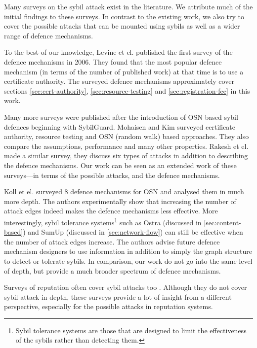 Many surveys on the sybil attack exist in the literature. We attribute much of
the initial findings to these surveys. In contrast to the existing work,
we also try to cover the possible attacks that can be mounted using sybils as
well as a wider range of defence mechanisms.

To the best of our knowledge, Levine et el. published the first survey of the
defence mechanisms\cite{marti2006taxonomy} in 2006. They found that the most
popular defence mechanism (in terms of the number of published work) at that
time is to use a certificate authority. The surveyed defence mechanisms
approximately cover sections \ref{sec:cert-authority},
\ref{sec:resource-testing} and \ref{sec:registration-fee} in this work.

Many more surveys were published after the introduction of OSN based sybil
defences beginning with SybilGuard. Mohaisen and Kim surveyed certificate
authority, resource testing and OSN (random walk) based
approaches\cite{mohaisen2013sybil}. They also compare the assumptions,
performance and many other properties. Rakesh et el. made a similar
survey\cite{rakesh2014survey}, they discuss six types of attacks in addition to
describing the defence mechanisms. Our work can be seen as an extended work of
these surveys---in terms of the possible attacks, and the defence mechanisms.

Koll et el. surveyed 8 defence mechanisms for OSN and analysed them in much more
depth\cite{koll2014state}. The authors experimentally show that increasing the
number of attack edges indeed makes the defence mechanisms less effective. More
interestingly, sybil tolerance systems\footnote{Sybil tolerance systems are
  those that are designed to limit the effectiveness of the sybils rather than
  detecting them.} such as Ostra (discussed in \autoref{sec:content-based}) and
SumUp (discussed in \autoref{sec:network-flow}) can still be effective when the
number of attack edges increase. The authors advise future defence mechanism
designers to use information in addition to simply the graph structure to detect
or tolerate sybils. In comparison, our work do not go into the same level of
depth, but provide a much broader spectrum of defence mechanisms.

Surveys of reputation often cover sybil attacks too \cite{marti2006taxonomy,
  hoffman2009survey, koutrouli2012taxonomy, selvaraj2012survey}. Although they
do not cover sybil attack in depth, these surveys provide a lot of insight from
a different perspective, especially for the possible attacks in reputation
systems.

